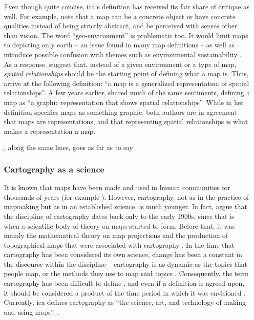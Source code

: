 Even though quite concise,
\acrshort{ica}'s definition has received its fair share of critique as well.
For example, \textcite{lap2021} note that
a map can be a concrete object or have concrete qualities
instead of being strictly abstract,
and be perceived with senses other than vision.
The word \enquote{geo-environment} is problematic too.
It would limit maps to depicting only earth
-- an issue found in many map definitions \parencite{tyn2014} --
as well as introduce possible confusion with themes such as
environmental sustainability \parencite{lap2021}.
As a response, \textcite{lap2021} suggest that,
instead of a given environment or a type of map,
\textit{spatial relationships} should be the starting point of defining what a map is.
Thus, \citeauthor{lap2021} arrive at the following definition:
\enquote{a map is a generalized representation of spatial relationships}.
A few years earlier, \textcite{tyn2014} shared much of the same sentiments,
defining a map as \enquote{a graphic representation that shows spatial relationships}.
While in her definition \citeauthor{tyn2014} specifies maps as something graphic,
both authors are in agreement that maps are representations,
and that representing spatial relationships is what makes a representation a map.

\textcite{mac2004}, along the same lines, goes as far as to say

\subsubsection{Cartography as a science}
It is known that
maps have been made and used in human communities for thousands of years
(for example \textcite{hsu1993, sch2014}).
However, cartography,
not as in the practice of mapmaking but as in an established science,
is much younger.
In fact, \textcite{woo2003, kai2020} argue that
the discipline of cartography dates back only to the early 1900s,
since that is when a scientific body of theory on maps started to form.
Before that, it was mainly the mathematical theory on map projections
and the production of topographical maps
that were associated with cartography \parencite{kai2020}.
In the time that cartography has been considered its own science,
change has been a constant in the discourse within the discipline \parencite{mac2004} --
cartography is as dynamic as the topics that people map,
or the methods they use to map said topics \parencite{tyn1992, tyn2014}.
Consequently,
the term cartography has been difficult to define \parencite{kry1995},
and even if a definition is agreed upon,
it should be considered a product of the time period
in which it was envisioned \parencite{tyn1992, and1996}.
Currently, \acrshort{ica} defines cartography as
\enquote{the science, art, and technology of making and using maps}.
\parencite{ica2019}.


